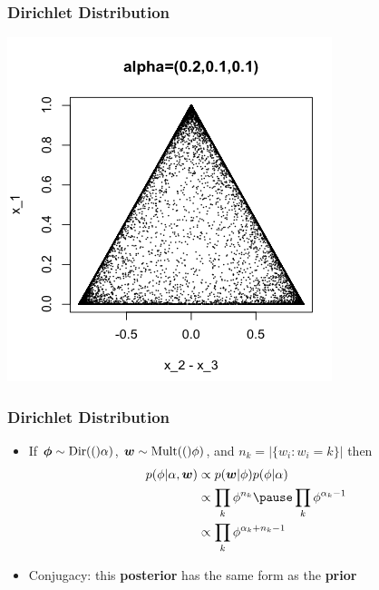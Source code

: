 \begin{frame}
\frametitle{Dirichlet Distribution}
\begin{center}
\includegraphics[width=0.5\linewidth]{topic_models/sparsity}
\end{center}
\end{frame}



\begin{frame}
\frametitle{Dirichlet Distribution}
\begin{itemize}
  \item If ${\bm \phi} \sim \mbox{Dir}(()\alpha)$, ${\bm w} \sim \mbox{Mult}( ()\phi)$, and $n_k = |\{ w_i : w_i = k\}|$ then
  \begin{align}
  	p(\phi | \alpha, {\bm w}) & \propto p({\bm w} | \phi) p(\phi | \alpha) \\
	                       & \propto  \prod_{k} \phi^{n_k} \pause  \prod_k { \phi^{\alpha_k - 1}} \\
	                       & \propto \prod_k \phi^{\alpha_k + n_k - 1}
  \end{align}
  \item Conjugacy: this {\bf posterior} has the same form as the {\bf prior}
\end{itemize}
\end{frame}




